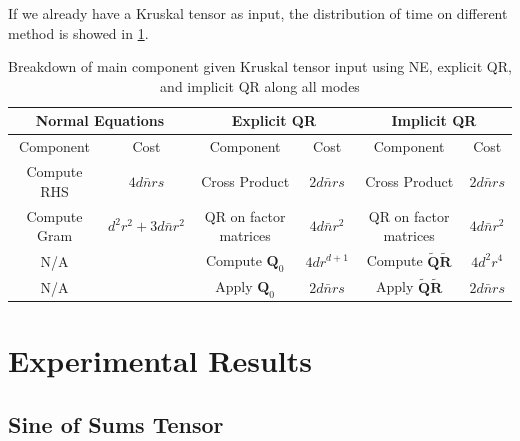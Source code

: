 \documentclass{article}
\newcommand{\mat}[1]{\mathbf{#1}}
\begin{document}
If we already have a Kruskal tensor as input, the distribution of time on different method is showed in \cref{tab:kruskal_its_part}.
\begin{table}[!ht] 
  \centering
  \begin{tabular}{|c|c|c|c|c|c|}
    \hline
    \multicolumn{2}{|c|}{\textbf{Normal Equations}} & \multicolumn{2}{|c|}{\textbf{Explicit QR}} & \multicolumn{2}{|c|}{\textbf{Implicit QR}} \\
    \hline
    Component & Cost & Component & Cost & Component & Cost \\
    \hline
    Compute RHS &$4d\bar n rs$ &  Cross Product&$2d\bar n rs$  & Cross Product &$2d\bar n rs$  \\
    Compute Gram & $d^2r^2+3d\bar n r^2$&QR on factor matrices & $4d \bar n r^2$ & QR on factor matrices & $4d \bar n r^2$\\
    N/A& &Compute $\mat{Q}_0$ & $4dr^{d+1}$& Compute $\tilde{\mat{Q}}\tilde{\mat{R}}$& $4d^2r^4$\\
    N/A & &Apply $\mat{Q}_0$& $2d\bar nrs$& Apply $\tilde{\mat{Q}}\tilde{\mat{R}}$& $2d \bar n rs$\\
    \hline
  \end{tabular}
  \caption{Breakdown of main component given Kruskal tensor input using NE, explicit QR, and implicit QR along all modes}
  \label{tab:kruskal_its_part}
\end{table}


  




\section{Experimental Results} \label{sec:result}


\subsection{Sine of Sums Tensor}
\end{document}
